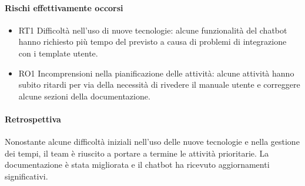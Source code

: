 \documentclass{article}
\begin{document}
            \paragraph{Rischi effettivamente occorsi}  
            \begin{itemize}  
                \item RT1 Difficoltà nell’uso di nuove tecnologie: alcune funzionalità del chatbot hanno richiesto più tempo del previsto a causa di problemi di integrazione con i template utente.  
                \item RO1 Incomprensioni nella pianificazione delle attività: alcune attività hanno subito ritardi per via della necessità di rivedere il manuale utente e correggere alcune sezioni della documentazione.  
            \end{itemize}  
            
            \paragraph{Retrospettiva}  
            Nonostante alcune difficoltà iniziali nell'uso delle nuove tecnologie e nella gestione dei tempi, il team è riuscito a portare a termine le attività prioritarie. La documentazione è stata migliorata e il chatbot ha ricevuto aggiornamenti significativi.
                


\end{document}

